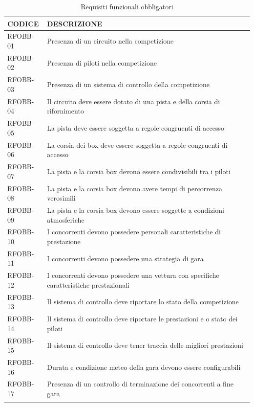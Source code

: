 \documentclass[a4paper,11pt, twoside]{book}
\begin{document}
  \begin{longtable}{|p{2cm}|p{8cm}|}
      \toprule
	\bfseries{CODICE} & \bfseries{DESCRIZIONE} \\\hline
      \endfirsthead
      RFOBB-01 & Presenza di un circuito nella competizione \\\hline
      RFOBB-02 & Presenza di piloti nella competizione \\\hline 
      RFOBB-03 & Presenza di un sistema di controllo della competizione \\\hline
      RFOBB-04 & Il circuito deve essere dotato di una pista e della corsia di rifornimento \\\hline
      RFOBB-05 & La pista deve essere soggetta a regole congruenti di accesso \\\hline
      RFOBB-06 & La corsia dei box deve essere soggetta a regole congruenti di accesso \\\hline
      RFOBB-07 & La pista e la corsia box devono essere condivisibili tra i piloti \\\hline
      RFOBB-08 & La pista e la corsia box devono avere tempi di percorrenza verosimili \\\hline
      RFOBB-09 & La pista e la corsia box devono essere soggette a condizioni atmosferiche \\\hline
      RFOBB-10 & I concorrenti devono possedere personali caratteristiche di prestazione  \\\hline
      RFOBB-11 & I concorrenti devono possedere una strategia di gara  \\\hline
      RFOBB-12 & I concorrenti devono possedere una vettura con specifiche caratteristiche prestazionali  \\\hline
      RFOBB-13 & Il sistema di controllo deve riportare lo stato della competizione  \\\hline
      RFOBB-14 & Il sistema di controllo deve riportare le prestazioni e o stato dei piloti  \\\hline
      RFOBB-15 & Il sistema di controllo deve tener traccia delle migliori prestazioni  \\\hline
      RFOBB-16 & Durata e condizione meteo della gara devono essere configurabili  \\\hline
      RFOBB-17 & Presenza di un controllo di terminazione dei concorrenti a fine gara  \\\hline
      \caption{Requisiti funzionali obbligatori}
      \label{tbl:RequisitiFunzionaliObbligatori}
    \end{longtable}
  
\end{document}
